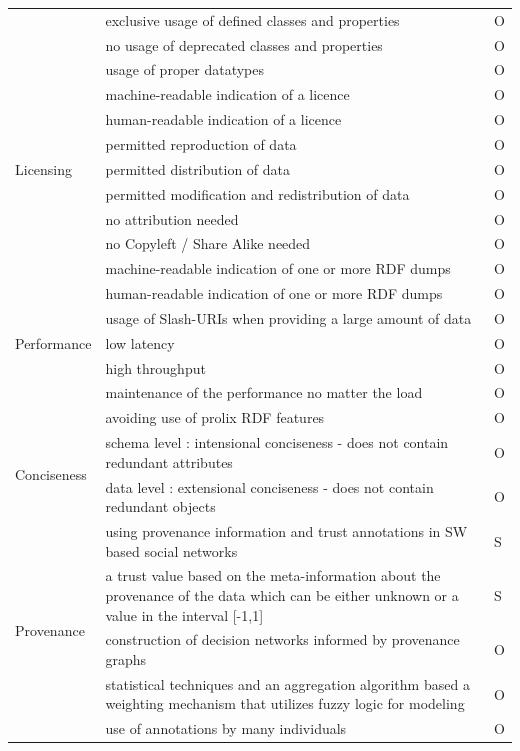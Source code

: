 \begin{longtable}{ | p{3cm} | p{10cm} | >{\centering\arraybackslash}p{2cm}| }
\cline{2-3}
& exclusive usage of defined classes and properties & O\\
\cline{2-3}
& no usage of deprecated classes and properties & O\\
\cline{2-3}
& usage of proper datatypes & O\\
\hline
\multirow{7}{*}{Licensing} & machine-readable indication of a licence & O\\
\cline{2-3}
& human-readable indication of a licence & O\\
\cline{2-3}
& permitted reproduction of data & O\\
\cline{2-3}
& permitted distribution of data & O\\
\cline{2-3}
& permitted modification and redistribution of data & O\\
\cline{2-3}
& no attribution needed & O\\
\cline{2-3}
& no Copyleft / Share Alike needed & O\\
\hline
\multirow{7}{*}{Performance} & machine-readable indication of one or more RDF dumps & O\\
\cline{2-3}
& human-readable indication of one or more RDF dumps & O\\
\cline{2-3}
& usage of Slash-URIs when providing a large amount of data & O\\
\cline{2-3}
& low latency & O\\
\cline{2-3}
& high throughput & O\\
\cline{2-3}
& maintenance of the performance no matter the load & O\\
\cline{2-3}
& avoiding use of prolix RDF features & O\\
\hline
\multirow{2}{*}{Conciseness} & schema level : intensional conciseness - does not contain redundant attributes & O\\
\cline{2-3}
& data level : extensional conciseness - does not contain redundant objects & O\\
\hline
\multirow{6}{*}{Provenance} & using provenance information and trust annotations in SW based social networks & S\\
\cline{2-3}
& a trust value based on the meta-information about the provenance of the data which can be either unknown or a value in the interval [-1,1]  & S\\
\cline{2-3}
& construction of decision networks informed by provenance graphs & O\\
\cline{2-3}
& statistical techniques and an aggregation algorithm based a weighting mechanism that utilizes fuzzy logic for modeling & O\\
\cline{2-3}
& use of annotations by many individuals & O\\
\hline
\end{longtable}
\twocolumn

